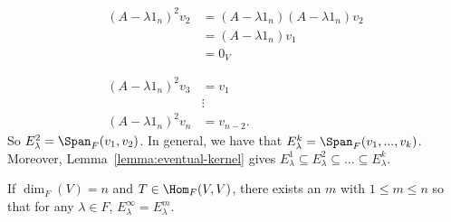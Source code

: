 \begin{example}
\begin{equation*}
\begin{split}
                \phantom{a} \\
                (A - \lambda 1_n)^2 v_2 &= (A - \lambda 1_n)(A - \lambda 1_n)v_2 \\
                & = (A - \lambda 1_n)v_1 \\
                & = 0_V \\
                \phantom{a} \\
                (A - \lambda 1_n)^2 v_3 &= v_1 \\
                &\vdots \\
                (A - \lambda 1_n)^2 v_n &= v_{n-2}. 
            \end{split}
            \end{equation*}
        So $E_\lambda^2 = \Span_F{(v_1,v_2)}$. In general, we have that $E_\lambda^k = \Span_F{(v_1,...,v_k)}$. Moreover,  Lemma~\ref{lemma:eventual-kernel} gives $E_\lambda^1 \subseteq E_\lambda^2 \subseteq ... \subseteq E_\lambda^k$.
    \end{example}

    \begin{corollary}
        If $\dim_F(V) = n$ and $T \in \Hom_F{(V,V)}$, there exists an $m$ with $1 \leq m \leq n$ so that for any $\lambda \in F$, $E_\lambda^\infty = E_\lambda^m$.
    \end{corollary}

